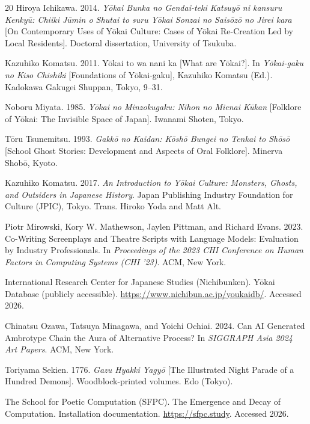 \documentclass[manuscript,review,anonymous,nonacm]{acmart}
\begin{document}
\begin{thebibliography}{20}
Hiroya Ichikawa. 2014.
\textit{Y\=okai Bunka no Gendai-teki Katsuy\=o ni kansuru Kenky\=u: Chiiki J\=umin o Shutai to suru Y\=okai Sonzai no Sais\=oz\=o no Jirei kara} [On Contemporary Uses of Y\=okai Culture: Cases of Y\=okai Re-Creation Led by Local Residents].
Doctoral dissertation, University of Tsukuba.

Kazuhiko Komatsu. 2011.
Y\=okai to wa nani ka [What are Y\=okai?]. In \textit{Y\=okai-gaku no Kiso Chishiki} [Foundations of Y\=okai-gaku], Kazuhiko Komatsu (Ed.). Kadokawa Gakugei Shuppan, Tokyo, 9--31.

Noboru Miyata. 1985.
\textit{Y\=okai no Minzokugaku: Nihon no Mienai K\=ukan} [Folklore of Y\=okai: The Invisible Space of Japan].
Iwanami Shoten, Tokyo.

T\=oru Tsunemitsu. 1993.
\textit{Gakk\=o no Kaidan: K\=osh\=o Bungei no Tenkai to Sh\=os\=o} [School Ghost Stories: Development and Aspects of Oral Folklore].
Minerva Shob\=o, Kyoto.

Kazuhiko Komatsu. 2017.
\textit{An Introduction to Y\=okai Culture: Monsters, Ghosts, and Outsiders in Japanese History}.
Japan Publishing Industry Foundation for Culture (JPIC), Tokyo.
Trans. Hiroko Yoda and Matt Alt.

Piotr Mirowski, Kory W. Mathewson, Jaylen Pittman, and Richard Evans. 2023.
Co-Writing Screenplays and Theatre Scripts with Language Models: Evaluation by Industry Professionals.
In \textit{Proceedings of the 2023 CHI Conference on Human Factors in Computing Systems (CHI '23)}. ACM, New York.

International Research Center for Japanese Studies (Nichibunken).
Y\=okai Database (publicly accessible).
\url{https://www.nichibun.ac.jp/youkaidb/}. Accessed 2026.

Chinatsu Ozawa, Tatsuya Minagawa, and Yoichi Ochiai. 2024.
Can AI Generated Ambrotype Chain the Aura of Alternative Process?
In \textit{SIGGRAPH Asia 2024 Art Papers}. ACM, New York.

Toriyama Sekien. 1776.
\textit{Gazu Hyakki Yagy\=o} [The Illustrated Night Parade of a Hundred Demons].
Woodblock-printed volumes. Edo (Tokyo).

The School for Poetic Computation (SFPC).
The Emergence and Decay of Computation.
Installation documentation. \url{https://sfpc.study}. Accessed 2026.


\end{thebibliography}
\end{document}

